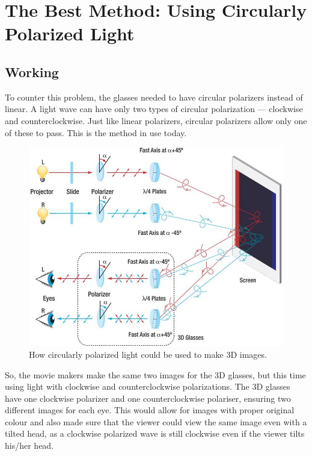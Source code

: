 \documentclass[11pt]{article}
\begin{document}
\section{The Best Method: Using Circularly Polarized Light}
\subsection{Working}

To counter this problem, the glasses needed to have circular polarizers instead of linear. A light wave can have only two types of circular polarization — clockwise and counterclockwise. Just like linear polarizers, circular polarizers allow only one of these to pass. This is the method in use today. 
\begin{figure}[H]
	\centering
	\includegraphics[scale=.5]{method 3.jpg}
	\caption{How circularly polarized light could be used to make 3D images.}
	\label{fig:This figure}
\end{figure}
So, the movie makers make the same two images for the 3D glasses, but this time using light with clockwise and counterclockwise polarizations. The 3D glasses have one clockwise polarizer and one counterclockwise polariser, ensuring two different images for each eye. This would allow for images with proper original colour and also made sure that the viewer could view the same image even with a tilted head, as a clockwise polarized wave is still clockwise even if the viewer tilts his/her head.
\end{document}
